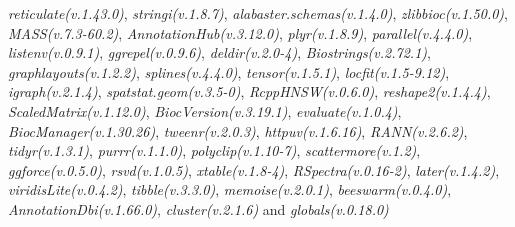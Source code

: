 \documentclass[
]{book}
\begin{document}
\emph{reticulate(v.1.43.0)}, \emph{stringi(v.1.8.7)}, \emph{alabaster.schemas(v.1.4.0)}, \emph{zlibbioc(v.1.50.0)}, \emph{MASS(v.7.3-60.2)}, \emph{AnnotationHub(v.3.12.0)}, \emph{plyr(v.1.8.9)}, \emph{parallel(v.4.4.0)}, \emph{listenv(v.0.9.1)}, \emph{ggrepel(v.0.9.6)}, \emph{deldir(v.2.0-4)}, \emph{Biostrings(v.2.72.1)}, \emph{graphlayouts(v.1.2.2)}, \emph{splines(v.4.4.0)}, \emph{tensor(v.1.5.1)}, \emph{locfit(v.1.5-9.12)}, \emph{igraph(v.2.1.4)}, \emph{spatstat.geom(v.3.5-0)}, \emph{RcppHNSW(v.0.6.0)}, \emph{reshape2(v.1.4.4)}, \emph{ScaledMatrix(v.1.12.0)}, \emph{BiocVersion(v.3.19.1)}, \emph{evaluate(v.1.0.4)}, \emph{BiocManager(v.1.30.26)}, \emph{tweenr(v.2.0.3)}, \emph{httpuv(v.1.6.16)}, \emph{RANN(v.2.6.2)}, \emph{tidyr(v.1.3.1)}, \emph{purrr(v.1.1.0)}, \emph{polyclip(v.1.10-7)}, \emph{scattermore(v.1.2)}, \emph{ggforce(v.0.5.0)}, \emph{rsvd(v.1.0.5)}, \emph{xtable(v.1.8-4)}, \emph{RSpectra(v.0.16-2)}, \emph{later(v.1.4.2)}, \emph{viridisLite(v.0.4.2)}, \emph{tibble(v.3.3.0)}, \emph{memoise(v.2.0.1)}, \emph{beeswarm(v.0.4.0)}, \emph{AnnotationDbi(v.1.66.0)}, \emph{cluster(v.2.1.6)} and \emph{globals(v.0.18.0)}

  
\end{document}

